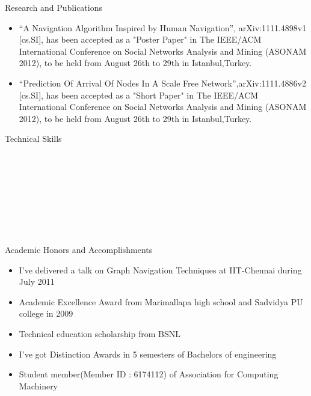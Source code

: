 \documentclass[a4paper,9pt]{article}
\begin{document}
\begin{resumeblockNoTable}{Research and Publications}
 \begin{itemize}
  \item  ``A Navigation Algorithm Inspired by Human Navigation'', arXiv:1111.4898v1 [cs.SI], has been accepted as a "Poster Paper" in The IEEE/ACM International Conference on Social Networks Analysis and Mining (ASONAM 2012), to be held from August 26th to 29th in Istanbul,Turkey.
  \item  ``Prediction Of Arrival Of Nodes In A Scale Free Network'',arXiv:1111.4886v2 [cs.SI], has been accepted as a "Short Paper" in The IEEE/ACM International Conference on Social Networks Analysis and Mining (ASONAM 2012), to be held from August 26th to 29th in Istanbul,Turkey. 
 \end{itemize}
\end{resumeblockNoTable}

\begin{resumeblock}{Technical Skills}

 \\
 \\
 \\
 \\
 \\
 \\
 \\

 \end{resumeblock}


\newpage
\begin{resumeblockNoTable}{Academic Honors and Accomplishments}
\begin{itemize}
 \item I've delivered a talk on Graph Navigation Techniques at IIT-Chennai during July 2011
 \item Academic Excellence Award from Marimallapa high school and Sadvidya PU college in 2009
 \item Technical education scholarship from BSNL
 \item I've got Distinction Awards in 5 semesters of Bachelors of engineering
 \item Student member(Member ID : 6174112) of Association for Computing Machinery
 \end{itemize}
\end{resumeblockNoTable}
\end{document}

